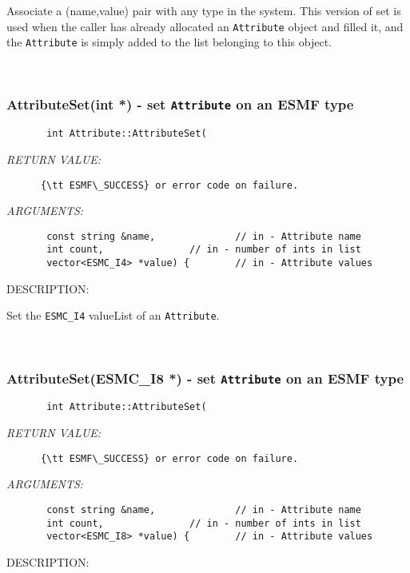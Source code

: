        Associate a (name,value) pair with any type in the system.
       This version of set is used when the caller has already allocated
       an {\tt Attribute} object and filled it, and the {\tt Attribute} 
       is simply added to the list belonging to this object.
   
 
\mbox{}\hrulefill\
 
\subsubsection [AttributeSet(int] {AttributeSet(int *) - set {\tt Attribute} on an ESMF type}


  
\begin{verbatim}       int Attribute::AttributeSet(\end{verbatim}{\em RETURN VALUE:}
\begin{verbatim}      {\tt ESMF\_SUCCESS} or error code on failure.
   \end{verbatim}{\em ARGUMENTS:}
\begin{verbatim}       const string &name,              // in - Attribute name
       int count,               // in - number of ints in list
       vector<ESMC_I4> *value) {        // in - Attribute values
   \end{verbatim}
{\sf DESCRIPTION:\\ }


      Set the {\tt ESMC\_I4} valueList of an {\tt Attribute}.
   
 
\mbox{}\hrulefill\
 
\subsubsection [AttributeSet(ESMC\_I8] {AttributeSet(ESMC\_I8 *) - set {\tt Attribute} on an ESMF type}


  
\begin{verbatim}       int Attribute::AttributeSet(\end{verbatim}{\em RETURN VALUE:}
\begin{verbatim}      {\tt ESMF\_SUCCESS} or error code on failure.
   \end{verbatim}{\em ARGUMENTS:}
\begin{verbatim}       const string &name,              // in - Attribute name
       int count,               // in - number of ints in list
       vector<ESMC_I8> *value) {        // in - Attribute values
   \end{verbatim}
{\sf DESCRIPTION:\\ }


